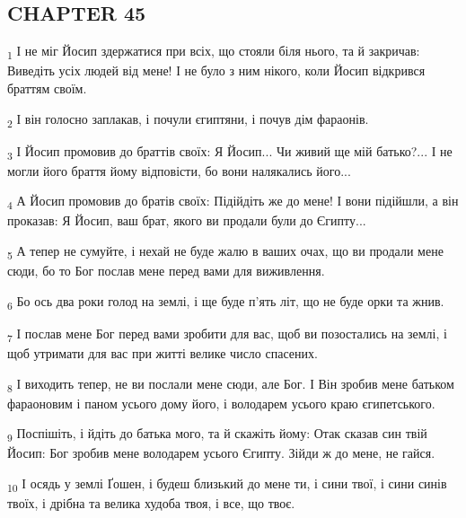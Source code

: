 \subsection{CHAPTER 45}
\begin{tcolorbox}
\textsubscript{1} І не міг Йосип здержатися при всіх, що стояли біля нього, та й закричав: Виведіть усіх людей від мене! І не було з ним нікого, коли Йосип відкрився браттям своїм.
\end{tcolorbox}
\begin{tcolorbox}
\textsubscript{2} І він голосно заплакав, і почули єгиптяни, і почув дім фараонів.
\end{tcolorbox}
\begin{tcolorbox}
\textsubscript{3} І Йосип промовив до браттів своїх: Я Йосип... Чи живий ще мій батько?... І не могли його браття йому відповісти, бо вони налякались його...
\end{tcolorbox}
\begin{tcolorbox}
\textsubscript{4} А Йосип промовив до братів своїх: Підійдіть же до мене! І вони підійшли, а він проказав: Я Йосип, ваш брат, якого ви продали були до Єгипту...
\end{tcolorbox}
\begin{tcolorbox}
\textsubscript{5} А тепер не сумуйте, і нехай не буде жалю в ваших очах, що ви продали мене сюди, бо то Бог послав мене перед вами для виживлення.
\end{tcolorbox}
\begin{tcolorbox}
\textsubscript{6} Бо ось два роки голод на землі, і ще буде п'ять літ, що не буде орки та жнив.
\end{tcolorbox}
\begin{tcolorbox}
\textsubscript{7} І послав мене Бог перед вами зробити для вас, щоб ви позостались на землі, і щоб утримати для вас при житті велике число спасених.
\end{tcolorbox}
\begin{tcolorbox}
\textsubscript{8} І виходить тепер, не ви послали мене сюди, але Бог. І Він зробив мене батьком фараоновим і паном усього дому його, і володарем усього краю єгипетського.
\end{tcolorbox}
\begin{tcolorbox}
\textsubscript{9} Поспішіть, і йдіть до батька мого, та й скажіть йому: Отак сказав син твій Йосип: Бог зробив мене володарем усього Єгипту. Зійди ж до мене, не гайся.
\end{tcolorbox}
\begin{tcolorbox}
\textsubscript{10} І осядь у землі Ґошен, і будеш близький до мене ти, і сини твої, і сини синів твоїх, і дрібна та велика худоба твоя, і все, що твоє.
\end{tcolorbox}
